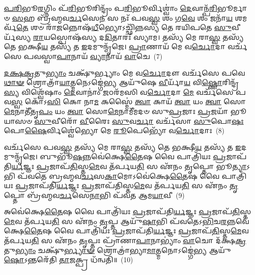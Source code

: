 {\anuvakamend[{𑌅𑌪᳴𑌶𑍍𑌯𑌨𑍍𑌤𑍋\-𑌽𑌗𑍍𑌨𑍀\-\ul{𑌷𑍋}\-𑌮𑍀𑌯᳴\-\ul{𑌮𑌾}\-𑌤𑍍𑌮\-\ul{𑌨𑌾} 𑌪\-\ul{𑌰𑌾} 𑌤𑍍𑌰𑍀𑌣𑌿᳴ 𑌚}]}%

\-\ul{𑌪}\-\-\ul{𑌰𑌿}\-𑌭𑍂\-\ul{𑌰}\-𑌗𑍍𑌨𑌿𑌂 𑌪᳴\-\ul{𑌰𑌿}\-𑌭𑍂𑌰𑌿𑌨𑍍𑌦𑍍𑌰𑌂᳴ 𑌪\-\ul{𑌰𑌿}\-𑌭𑍂𑌰𑍍𑌵𑌿𑌶𑍍𑌵𑌾𑌂॑ \ul{𑌦𑍇}\-𑌵𑌾𑌨𑍍𑌪᳴\-\ul{𑌰𑌿}\-𑌭𑍂𑌰𑍍𑌮𑌾𑍞 \ul{𑌸}\-𑌹 𑌬𑍍𑌰᳴𑌹𑍍𑌮𑌵\-\ul{𑌰𑍍𑌚}\-𑌸𑍇\-\ul{𑌨} 𑌸 𑌨𑌃᳴ 𑌪𑌵\-\ul{𑌸𑍍𑌵} 𑌶𑌂 𑌗\-\ul{𑌵𑍇} 𑌶𑌂 𑌜𑌨𑌾᳴\-\ul{𑌯} 𑌶𑌮𑌰𑍍𑌵᳴\-\ul{𑌤𑍇} 𑌶𑍞 𑌰𑌾᳴\-\ul{𑌜}\-𑌨𑍍𑌨𑍋𑌷᳴\-\ul{𑌧𑍀}\-𑌭𑍍𑌯𑍋\-𑌽𑌚𑍍𑌛𑌿᳴𑌨𑍍𑌨𑌸𑍍𑌯 𑌤𑍇 𑌰𑌯𑌿𑌪𑌤𑍇 \ul{𑌸𑍁}\-𑌵𑍀𑌰𑍍𑌯᳴𑌸𑍍𑌯 \ul{𑌰𑌾}\-𑌯𑌸𑍍𑌪𑍋𑌷᳴𑌸𑍍𑌯 𑌦\-\ul{𑌦𑌿}\-𑌤𑌾𑌰𑌃᳴ 𑌸𑍍𑌯𑌾𑌮। 𑌤𑌸𑍍𑌯᳴ 𑌮𑍇 𑌰𑌾\-\ul{𑌸𑍍𑌵} 𑌤𑌸𑍍𑌯᳴ 𑌤𑍇 𑌭𑌕𑍍𑌷𑍀\-\ul{𑌯} 𑌤𑌸𑍍𑌯᳴ 𑌤 \ul{𑌇}\-𑌦𑌮𑍁𑌨𑍍𑌮𑍃᳴𑌜𑍇। \ul{𑌪𑍍𑌰𑌾}\-𑌣𑌾𑌯᳴ 𑌮𑍇 𑌵\-\ul{𑌰𑍍𑌚𑍋}\-𑌦𑌾 𑌵𑌰𑍍𑌚᳴𑌸𑍇 𑌪𑌵𑌸𑍍𑌵𑌾\-\ul{𑌪𑌾}\-𑌨𑌾𑌯᳴ \ul{𑌵𑍍𑌯𑌾}\-𑌨𑌾𑌯᳴ \ul{𑌵𑌾}\-𑌚𑍇~(7)

\-\ul{𑌦}\-\-\ul{𑌕𑍍𑌷}\-\-\ul{𑌕𑍍𑌰}\-𑌤𑍁\-\ul{𑌭𑍍𑌯𑌾𑌂} 𑌚𑌕𑍍𑌷𑍁᳴𑌰𑍍𑌭𑍍𑌯𑌾𑌂 𑌮𑍇 𑌵\-\ul{𑌰𑍍𑌚𑍋}\-𑌦𑍗 𑌵𑌰𑍍𑌚᳴𑌸𑍇 𑌪𑌵𑍇\-\ul{𑌥𑌾}\-\-\ul{𑍟} 𑌶𑍍𑌰𑍋𑌤𑍍𑌰𑌾᳴\-\ul{𑌯𑌾}\-𑌤𑍍𑌮𑌨𑍇\-𑌽𑌙𑍍𑌗𑍇॑\-\ul{𑌭𑍍𑌯} 𑌆𑌯𑍁᳴𑌷𑍇 \ul{𑌵𑍀}\-𑌰𑍍𑌯𑌾᳴\-\ul{𑌯} 𑌵𑌿\-\ul{𑌷𑍍𑌣𑍋}\-𑌰𑌿𑌨𑍍𑌦𑍍𑌰᳴\-\ul{𑌸𑍍𑌯} 𑌵𑌿𑌶𑍍𑌵𑍇᳴𑌷𑌾𑌂 \ul{𑌦𑍇}\-𑌵𑌾𑌨𑌾𑌂॑ \ul{𑌜}\-𑌠𑌰᳴𑌮𑌸𑌿 𑌵\-\ul{𑌰𑍍𑌚𑍋}\-𑌦𑌾 \ul{𑌮𑍇} 𑌵𑌰𑍍𑌚᳴𑌸𑍇 𑌪𑌵\-\ul{𑌸𑍍𑌵} 𑌕𑍋᳴\-𑌽\-\ul{𑌸𑌿} 𑌕𑍋 𑌨𑌾\-\ul{𑌮} 𑌕𑌸𑍍𑌮𑍈॑ \ul{𑌤𑍍𑌵𑌾} 𑌕𑌾𑌯᳴ \ul{𑌤𑍍𑌵𑌾} 𑌯𑌂 \ul{𑌤𑍍𑌵𑌾} 𑌸𑍋\-\ul{𑌮𑍇}\-𑌨𑌾𑌤𑍀᳴𑌤𑍃\-\ul{𑌪𑌂} 𑌯𑌂 \ul{𑌤𑍍𑌵𑌾} 𑌸𑍋\-\ul{𑌮𑍇}\-𑌨𑌾𑌮𑍀᳴𑌮𑌦𑍞 𑌸𑍁\-\ul{𑌪𑍍𑌰}\-𑌜𑌾𑌃 \ul{𑌪𑍍𑌰}\-𑌜𑌯𑌾᳴ 𑌭𑍂𑌯𑌾𑌸𑍞 \ul{𑌸𑍁}\-𑌵𑍀𑌰𑍋᳴ \ul{𑌵𑍀}\-𑌰𑍈𑌃 \ul{𑌸𑍁}\-𑌵\-\ul{𑌰𑍍𑌚𑌾} 𑌵𑌰𑍍𑌚᳴𑌸𑌾 \ul{𑌸𑍁}\-𑌪𑍋\-\ul{𑌷𑌃} 𑌪𑍋\-\ul{𑌷𑍈}\-𑌰𑍍𑌵𑌿𑌶𑍍𑌵𑍇॑𑌭𑍍𑌯𑍋 𑌮𑍇 \ul{𑌰𑍂}\-𑌪𑍇𑌭𑍍𑌯𑍋᳴ 𑌵\-\ul{𑌰𑍍𑌚𑍋}\-𑌦𑌾𑌃~(8)

𑌵𑌰𑍍𑌚᳴𑌸𑍇 𑌪𑌵\-\ul{𑌸𑍍𑌵} 𑌤𑌸𑍍𑌯᳴ 𑌮𑍇 𑌰𑌾\-\ul{𑌸𑍍𑌵} 𑌤𑌸𑍍𑌯᳴ 𑌤𑍇 𑌭𑌕𑍍𑌷𑍀\-\ul{𑌯} 𑌤𑌸𑍍𑌯᳴ 𑌤 \ul{𑌇}\-𑌦𑌮𑍁𑌨𑍍𑌮𑍃᳴𑌜𑍇। 𑌬𑍁𑌭𑍂᳴\-\ul{𑌷}\-𑌨𑍍𑌨𑌵𑍇॑𑌕𑍍𑌷𑍇\-\ul{𑌤𑍈}\-𑌷 𑌵𑍈 𑌪𑌾𑌤𑍍𑌰𑌿᳴𑌯𑌃 \ul{𑌪𑍍𑌰}\-𑌜𑌾𑌪᳴𑌤𑌿\-\ul{𑌰𑍍𑌯}\-𑌜𑍍𑌞𑌃 \ul{𑌪𑍍𑌰}\-𑌜𑌾𑌪᳴\-\ul{𑌤𑌿}\-𑌸𑍍𑌤\-\ul{𑌮𑍇}\-𑌵 𑌤᳴𑌰𑍍𑌪𑌯\-\ul{𑌤𑌿} 𑌸 𑌏᳴𑌨𑌂 \ul{𑌤𑍃}\-𑌪𑍍𑌤𑍋 𑌭𑍂\-\ul{𑌤𑍍𑌯𑌾}\-\-𑌽𑌭𑌿 𑌪᳴𑌵𑌤𑍇 𑌬𑍍𑌰𑌹𑍍𑌮𑌵\-\ul{𑌰𑍍𑌚}\-𑌸\-\ul{𑌕𑌾}\-𑌮𑍋\-𑌽𑌵𑍇॑𑌕𑍍𑌷𑍇\-\ul{𑌤𑍈}\-𑌷 𑌵𑍈 𑌪𑌾𑌤𑍍𑌰𑌿᳴𑌯𑌃 \ul{𑌪𑍍𑌰}\-𑌜𑌾𑌪᳴𑌤𑌿\-\ul{𑌰𑍍𑌯}\-𑌜𑍍𑌞𑌃 \ul{𑌪𑍍𑌰}\-𑌜𑌾𑌪᳴𑌤𑌿𑌸𑍍𑌤\-\ul{𑌮𑍇}\-𑌵 𑌤᳴𑌰𑍍𑌪𑌯\-\ul{𑌤𑌿} 𑌸 𑌏᳴𑌨𑌂 \ul{𑌤𑍃}\-𑌪𑍍𑌤𑍋 𑌬𑍍𑌰᳴𑌹𑍍𑌮𑌵\-\ul{𑌰𑍍𑌚}\-𑌸𑍇\-\ul{𑌨𑌾}\-𑌭𑌿 𑌪᳴𑌵𑌤 𑌆𑌮\-\ul{𑌯𑌾}\-𑌵𑍀~(9)

𑌅𑌵𑍇॑𑌕𑍍𑌷𑍇\-\ul{𑌤𑍈}\-𑌷 𑌵𑍈 𑌪𑌾𑌤𑍍𑌰𑌿᳴𑌯𑌃 \ul{𑌪𑍍𑌰}\-𑌜𑌾𑌪᳴𑌤𑌿\-\ul{𑌰𑍍𑌯}\-𑌜𑍍𑌞𑌃 \ul{𑌪𑍍𑌰}\-𑌜𑌾𑌪᳴\-\ul{𑌤𑌿}\-𑌸𑍍𑌤\-\ul{𑌮𑍇}\-𑌵 𑌤᳴𑌰𑍍𑌪𑌯\-\ul{𑌤𑌿} 𑌸 𑌏᳴𑌨𑌂 \ul{𑌤𑍃}\-𑌪𑍍𑌤 𑌆𑌯𑍁᳴\-\ul{𑌷𑌾}\-𑌭𑌿 𑌪᳴𑌵𑌤𑍇\-𑌽\-\ul{𑌭𑌿}\-𑌚\-\ul{𑌰}\-𑌨𑍍𑌨𑌵𑍇॑𑌕𑍍𑌷𑍇\-\ul{𑌤𑍈}\-𑌷 𑌵𑍈 𑌪𑌾𑌤𑍍𑌰𑌿᳴𑌯𑌃 \ul{𑌪𑍍𑌰}\-𑌜𑌾𑌪᳴𑌤𑌿\-\ul{𑌰𑍍𑌯}\-𑌜𑍍𑌞𑌃 \ul{𑌪𑍍𑌰}\-𑌜𑌾𑌪᳴\-\ul{𑌤𑌿}\-𑌸𑍍𑌤\-\ul{𑌮𑍇}\-𑌵 𑌤᳴𑌰𑍍𑌪𑌯\-\ul{𑌤𑌿} 𑌸 𑌏᳴𑌨𑌂 \ul{𑌤𑍃}\-𑌪𑍍𑌤𑌃 𑌪𑍍𑌰𑌾᳴𑌣𑌾\-\ul{𑌪𑌾}\-𑌨𑌾\-𑌭𑍍𑌯𑌾𑌂॑ \ul{𑌵𑌾}\-𑌚𑍋 𑌦᳴𑌕𑍍𑌷\-\ul{𑌕𑍍𑌰}\-𑌤𑍁\-\ul{𑌭𑍍𑌯𑌾𑌂} 𑌚𑌕𑍍𑌷𑍁᳴\-\ul{𑌰𑍍𑌭𑍍𑌯𑌾}\-\-\ul{𑍟} 𑌶𑍍𑌰𑍋𑌤𑍍𑌰𑌾॑𑌭𑍍𑌯𑌾\-\ul{𑌮𑌾}\-𑌤𑍍𑌮𑌨𑍋\-𑌽𑌙𑍍𑌗𑍇॑\-\ul{𑌭𑍍𑌯} 𑌆𑌯𑍁᳴\-\ul{𑌷𑍋}\-\-𑌽𑌨𑍍𑌤𑌰𑍇᳴𑌤𑌿 \ul{𑌤𑌾}\-𑌜𑌕𑍍𑌪𑍍𑌰 𑌧᳴𑌨𑍍𑌵𑌤𑌿॥~(10)

{\anuvakamend[{\-\ul{𑌵𑌾}\-𑌚𑍇 \ul{𑌰𑍂}\-𑌪𑍇𑌭𑍍𑌯𑍋᳴ 𑌵\-\ul{𑌰𑍍𑌚𑍋}\-𑌦𑌾 𑌆᳴𑌮\-\ul{𑌯𑌾}\-𑌵𑍀 𑌪𑌞𑍍𑌚᳴𑌚𑌤𑍍𑌵𑌾𑌰𑌿𑍞𑌶𑌚𑍍𑌚}]}%

